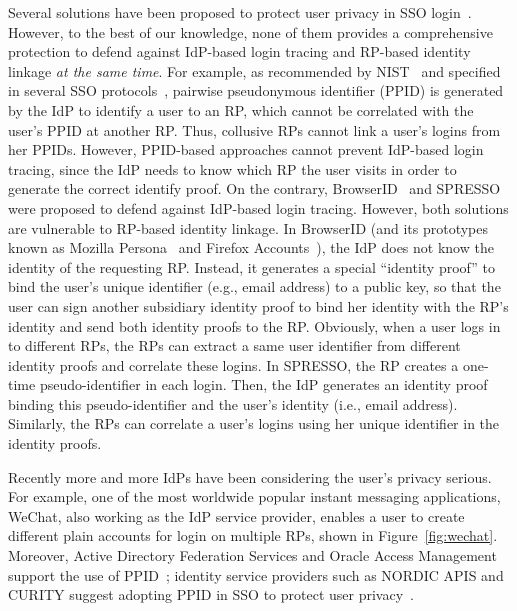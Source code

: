
Several solutions have been proposed to protect user privacy in SSO login~\cite{maler2008venn,NIST2017draft,BrowserID,SPRESSO}. However, to the best of our knowledge, none of them provides a comprehensive protection to defend against IdP-based login tracing and RP-based identity linkage {\em at the same time}. For example, as recommended by NIST~\cite{NIST2017draft} and specified in several SSO protocols~\cite{OpenIDConnect, SAMLIdentifier}, pairwise pseudonymous identifier (PPID) is generated by the IdP to identify a user to an RP, which cannot be correlated with the user's PPID at another RP. Thus, collusive RPs cannot link a user's logins from her PPIDs. However, PPID-based approaches cannot prevent IdP-based login tracing, since the IdP needs to know which RP the user visits in order to generate the correct identify proof. On the contrary, BrowserID~\cite{BrowserID} and SPRESSO~\cite{SPRESSO} were proposed to defend against IdP-based login tracing. However, both solutions are vulnerable to RP-based identity linkage. In BrowserID (and its prototypes known as Mozilla Persona~\cite{persona} and Firefox Accounts~\cite{FirefoxAccount}), the IdP does not know the identity of the requesting RP. Instead, it generates a special ``identity proof'' to bind the user's unique identifier (e.g., email address) to a public key, so that the user can sign another subsidiary identity proof to bind her identity with the RP's identity and send both identity proofs to the RP. Obviously, when a user logs in to different RPs, the RPs can extract a same user identifier from different identity proofs and correlate these logins. In SPRESSO, the RP creates a one-time pseudo-identifier in each login. Then, the IdP generates an identity proof binding this pseudo-identifier and the user's identity (i.e., email address). %
Similarly, the RPs can correlate a user's logins using her unique identifier in the identity proofs.

Recently more and more IdPs have been considering the user's privacy serious. For example, one of the most worldwide popular instant messaging applications, WeChat, also working as the IdP service provider, enables a user to create different  plain accounts for login on multiple RPs, shown in Figure~\ref{fig:wechat}.  Moreover,  Active Directory Federation Services and Oracle Access Management support the use of PPID~\cite{MS, Oracle}; identity service providers such as NORDIC APIS and CURITY suggest adopting PPID in SSO to protect user privacy~\cite{Nordic, Curity}.

